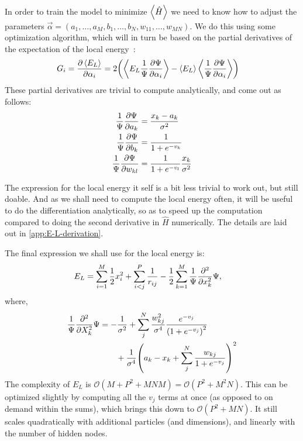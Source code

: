 \documentclass[a4paper, 11pt]{article}
\begin{document}
\begin{multicols}{2}
    In order to train the model to minimize $\expval{\hat H}$ we need to know
    how to adjust the parameters $\vec\alpha = (a_1,\dots,a_M,
    b_1,\dots,b_N,w_{11},\dots,w_{MN})$. We do this using some optimization
    algorithm, which will in turn be based on the partial derivatives of the
    expectation of the local energy~\cite{mhj-compphys-II}:
    \begin{align}
        G_i &= \pdv{\expval{E_L}}{\alpha_i} 
            = 2\qty(\expval{E_L
        \frac{1}{\Psi}\pdv{\Psi}{\alpha_i}} -
        \expval{E_L}\expval{\frac{1}{\Psi}\pdv{\Psi}{\alpha_i}})
    \end{align}
    These partial derivatives are trivial to compute analytically, and come out as
    follows:
    \begin{align}
        \frac{1}{\Psi}\pdv{\Psi}{a_k} &=
        \frac{x_k-a_k}{\sigma^2}\label{eq:pdv-a}\\
        \frac{1}{\Psi}\pdv{\Psi}{b_k} &= \frac{1}{1 +
        e^{-v_k}}\label{eq:pdv-b}\\
        \frac{1}{\Psi}\pdv{\Psi}{w_{kl}} &= \frac{1}{1 +
        e^{-v_l}}\frac{x_k}{\sigma^2}
    \end{align}

    The expression for the local energy it self is a bit less trivial to work
    out, but still doable. And as we shall need to compute the local energy often,
    it will be useful to do the differentiation analytically, so as to speed up
    the computation compared to doing the second derivative in $\hat H$
    numerically. The details are laid out in \autoref{app:E-L-derivation}.

    The final expression we shall use for the local energy is:
    \begin{align}
        E_L &= \sum_{i=1}^M \frac{1}{2}x_i^2 + \sum_{i<j}^{P} \frac{1}{r_{ij}}
        - \frac{1}{2} \sum_{k=1}^M
        \frac{1}{\Psi}\pdv[2]{}{x_k}\Psi,\label{eq:E-L-final-main-section}
    \end{align}
    where,
    \begin{align}
        \begin{split}
            \frac{1}{\Psi}\pdv[2]{}{X_k}\Psi 
            &= -\frac{1}{\sigma^2} + \sum_j^N
            \frac{w_{kj}^2}{\sigma^4}
            \frac{e^{-v_j}}{\qty(1+e^{-v_j})^2} \\
            &\quad{   }\quad{      }  +
            \frac{1}{\sigma^4}\qty(a_k-x_k+\sum_j^N \frac{w_{kj}}{1+e^{-v_j}})^2
        \end{split}
        \label{eq:E-L-second-deriv-main-section}
    \end{align}
    The complexity of $E_L$ is $\mathcal{O}(M + P^2 + MNM) = \mathcal{O}(P^2 +
    M^2 N)$. This can be optimized slightly by computing all the $v_j$ terms at
    once (as opposed to on demand within the sums), which brings this down to
    $\mathcal{O}(P^2 + MN)$. It still scales quadratically with additional
    particles (and dimensions), and linearly with the number of hidden nodes.


\end{multicols}
\end{document}
